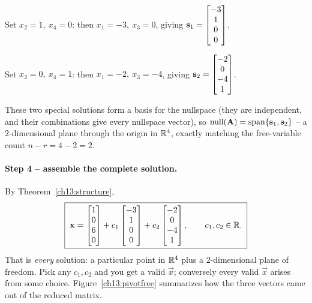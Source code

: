 Set $x_2=1,\ x_4=0$: then $x_1=-3,\ x_3=0$, giving
$\mathbf{s}_1=\begin{bmatrix}-3\\1\\0\\0\end{bmatrix}$.

Set $x_2=0,\ x_4=1$: then $x_1=-2,\ x_3=-4$, giving
$\mathbf{s}_2=\begin{bmatrix}-2\\0\\-4\\1\end{bmatrix}$.

These two special solutions form a basis for the nullspace (they are independent, and
their combinations give every nullspace vector), so $\operatorname{null}(\mathbf{A})=\operatorname{span}\{\mathbf{s}_1,\mathbf{s}_2\}$ -- a
$2$-dimensional plane through the origin in $\mathbb{R}^4$, exactly matching the free-variable count
$n-r=4-2=2$.

\paragraph{Step 4 -- assemble the complete solution.} By
Theorem~\ref{ch13:structure},
\[
  \boxed{\;
  \mathbf{x}=\begin{bmatrix}1\\0\\6\\0\end{bmatrix}
     + c_1\begin{bmatrix}-3\\1\\0\\0\end{bmatrix}
     + c_2\begin{bmatrix}-2\\0\\-4\\1\end{bmatrix},
  \qquad c_1,c_2\in\mathbb{R}.\;}
\]
That is \emph{every} solution: a particular point in $\mathbb{R}^4$ plus a $2$-dimensional plane of
freedom. Pick any $c_1,c_2$ and you get a valid $\vec{x}$; conversely every valid $\vec{x}$
arises from some choice. Figure~\ref{ch13:pivotfree} summarizes how the three vectors
came out of the reduced matrix.

